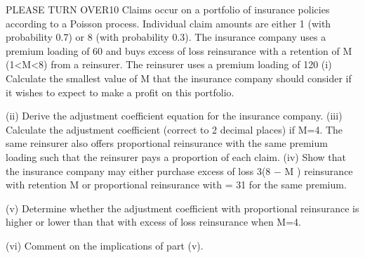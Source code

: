 
PLEASE TURN OVER10
Claims occur on a portfolio of insurance policies according to a Poisson process.
Individual claim amounts are either 1 (with probability 0.7) or 8 (with probability
0.3). The insurance company uses a premium loading of 60%
and buys excess of loss reinsurance with a retention of M (1<M<8) from a reinsurer.
The reinsurer uses a premium loading of 120%
(i) Calculate the smallest value of M that the insurance company should consider
if it wishes to expect to make a profit on this portfolio.

(ii) Derive the adjustment coefficient equation for the insurance company. 
(iii) Calculate the adjustment coefficient (correct to 2 decimal places) if M=4. 
The same reinsurer also offers proportional reinsurance with the same premium
loading such that the reinsurer pays a proportion \alpha  of each claim.
(iv) Show that the insurance company may either purchase excess of loss
3(8 − M )
reinsurance with retention M or proportional reinsurance with \alpha  =
31
for the same premium.

(v) Determine whether the adjustment coefficient with proportional reinsurance is
higher or lower than that with excess of loss reinsurance when M=4.

(vi) Comment on the implications of part (v).

